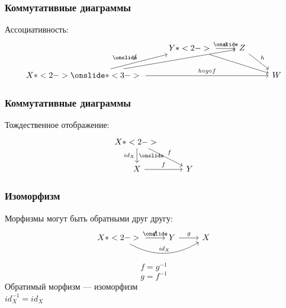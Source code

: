 \documentclass{beamer}
\begin{document}
\begin{frame}[fragile]
\frametitle{Коммутативные диаграммы}
Ассоциативность:
\begin{equation}
\begin{tikzcd}
& Y \arrow{r}{g}  \onslide*<2->{\arrow{rrd}}
& Z \arrow{rd}{h}
& \\ X \arrow{ru}{f} \onslide*<2->{\arrow{rru}} \onslide*<3->{\arrow{rrr}{h\circ g\circ f}}
&&& W
\end{tikzcd}
\end{equation}
\end{frame}

\begin{frame}[fragile]
\frametitle{Коммутативные диаграммы}
Тождественное отображение:
\begin{equation}
\begin{tikzcd}
X \arrow{d}[swap]{id_X} \onslide*<2->{\arrow{rd}{f}} & \\
X \arrow{r}{f} & Y
\end{tikzcd}
\end{equation}
\end{frame}

\begin{frame}[fragile]
\frametitle{Изоморфизм}
Морфизмы могут быть обратными друг другу:
\begin{equation}
\begin{tikzcd}
X \arrow{r}{f} \onslide*<2->{\arrow[bend right]{rr}{id_X}} & Y \arrow{r}{g} & X
\end{tikzcd}
\end{equation}
\pause
\begin{equation}f = g^{-1}\end{equation}
\begin{equation}g = f^{-1}\end{equation}
Обратимый морфизм --- изоморфизм
\\
\begin{math}id_X^{-1} = id_X\end{math}
\end{frame}
\end{document}
